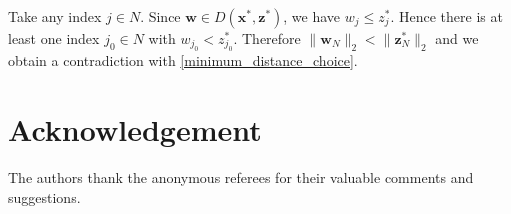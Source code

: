 \documentclass[runningheads]{llncs}
\newcommand{\ve}{\boldsymbol}
\renewcommand\>{\rangle}
\newcommand\<{\langle}
\newcommand\0{\mathbf{0}}
\begin{document}
Take any index $j\in N$. Since ${\ve w}\in D({\ve x}^*, {\ve z}^*)$, %
we have $w_j\le z^*_j$. Hence there is at least one index $j_0\in N$ with $w_{j_0}< z^*_{j_0}$. Therefore  $\|{\ve w}_N\|_2< \|{\ve z}^*_N\|_2$ and we obtain a contradiction with \eqref{minimum_distance_choice}.




 
 



\section{Acknowledgement}

The authors thank the anonymous referees for their valuable comments and suggestions.
\end{document}
